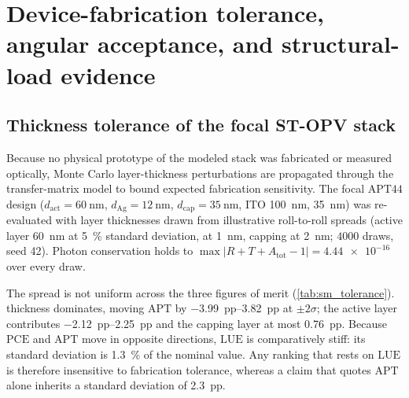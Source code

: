 \documentclass[preprint,12pt,a4paper]{elsarticle}
\begin{document}
\section{Device-fabrication tolerance, angular acceptance, and structural-load evidence}
\label{sec:sm_device_struct}

\subsection{Thickness tolerance of the focal ST-OPV stack}
\label{sec:sm_tolerance}

Because no physical prototype of the modeled stack was fabricated or measured optically, Monte Carlo layer-thickness perturbations are propagated through the transfer-matrix model to bound expected fabrication sensitivity. The focal $\mathrm{APT44}$ design ($d_{\mathrm{act}}=\qty{60}{\nano\meter}$, $d_{\mathrm{Ag}}=\qty{12}{\nano\meter}$, $d_{\mathrm{cap}}=\qty{35}{\nano\meter}$, ITO \qty{100}{\nano\meter},  \qty{35}{\nano\meter}) was re-evaluated with layer thicknesses drawn from illustrative roll-to-roll spreads (active layer \qty{60}{\nano\meter} at \qty{5}{\percent} standard deviation,  at \qty{1}{\nano\meter}, capping  at \qty{2}{\nano\meter}; $\num{4000}$ draws, seed 42). Photon conservation holds to $\max|R+T+A_{\mathrm{tot}}-1|=\num{4.44e-16}$ over every draw.

The spread is not uniform across the three figures of merit (\cref{tab:sm_tolerance}).  thickness dominates, moving $\mathrm{APT}$ by \qtyrange{-3.99}{+3.82}{pp} at $\pm2\sigma$; the active layer contributes \qtyrange{-2.12}{+2.25}{pp} and the capping layer at most \qty{0.76}{pp}. Because $\mathrm{PCE}$ and $\mathrm{APT}$ move in opposite directions, $\mathrm{LUE}$ is comparatively stiff: its standard deviation is \qty{1.3}{\percent} of the nominal value. Any ranking that rests on $\mathrm{LUE}$ is therefore insensitive to fabrication tolerance, whereas a claim that quotes $\mathrm{APT}$ alone inherits a standard deviation of \qty{2.3}{pp}.
\end{document}
